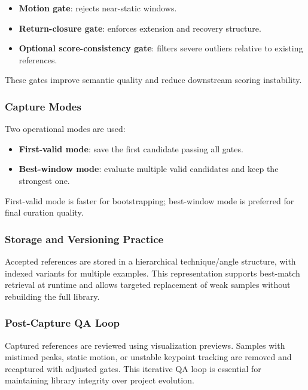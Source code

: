 \documentclass[12pt]{article}
\begin{document}
{\begin{itemize}
    \item \textbf{Motion gate}: rejects near-static windows.
    \item \textbf{Return-closure gate}: enforces extension and recovery structure.
    \item \textbf{Optional score-consistency gate}: filters severe outliers relative to existing references.
\end{itemize}

These gates improve semantic quality and reduce downstream scoring instability.

\subsubsection{Capture Modes}

Two operational modes are used:

\begin{itemize}
    \item \textbf{First-valid mode}: save the first candidate passing all gates.
    \item \textbf{Best-window mode}: evaluate multiple valid candidates and keep the strongest one.
\end{itemize}

First-valid mode is faster for bootstrapping; best-window mode is preferred for final curation quality.

\subsubsection{Storage and Versioning Practice}

Accepted references are stored in a hierarchical technique/angle structure, with indexed variants for multiple examples. This representation supports best-match retrieval at runtime and allows targeted replacement of weak samples without rebuilding the full library.

\subsubsection{Post-Capture QA Loop}

Captured references are reviewed using visualization previews. Samples with mistimed peaks, static motion, or unstable keypoint tracking are removed and recaptured with adjusted gates. This iterative QA loop is essential for maintaining library integrity over project evolution.

}
\end{document}
